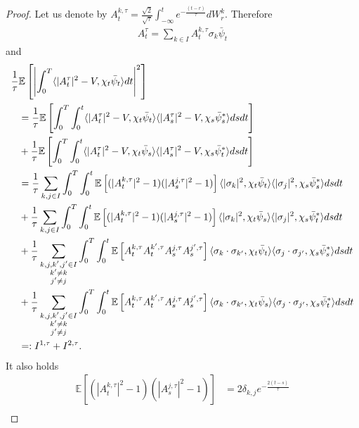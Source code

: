 \documentclass[10pt,a4paper]{amsart}
\begin{document}
\begin{proof}
Let us denote by $A^{k,\tau}_t=\frac{\sqrt{2}}{\sqrt{\tau}}\int_{-\infty}^t e^{-\frac{(t-r)}{\tau}}dW^{k}_r$. Therefore
\begin{align*}
    A^{\tau}_t=\sum_{k\in I } A^{k,\tau}_t\sigma_k\bar\psi_t
\end{align*}
and 
\begin{align}
\frac{1}{\tau}&\mathbb{E}\left[\left|\int_0^T \langle |A^\tau_t|^2-V, \chi_t\bar{\psi}_t\rangle dt\right|^2\right]\notag
\\ & = \frac{1}{\tau}\mathbb{E}\left[\int_0^T\int_0^t \langle |A^\tau_t|^2-V, \chi_t \bar{\psi}_t\rangle  
\langle |A^\tau_s|^2-V, \chi_s\bar{\psi}^*_s\rangle ds dt\right]\notag\\ &+\frac{1}{\tau}\mathbb{E}\left[\int_0^T\int_0^t \langle |A^\tau_t|^2-V, \chi_t \bar{\psi}_s\rangle  
\langle |A^\tau_s|^2-V, \chi_s\bar{\psi}^*_t\rangle ds dt\right]\notag\\
&= \frac{1}{\tau}\sum_{k,j\in I}\int_0^T\int_0^t 
\mathbb{E}\left[(|A^{k,\tau}_t|^2-1)(|A^{j,\tau}_s|^2-1)\right]
\langle |\sigma_k|^2, \chi_t\bar{\psi}_t\rangle 
\langle |\sigma_j|^2, \chi_s\bar{\psi}^*_s\rangle ds dt\notag\\&
+\frac{1}{\tau}\sum_{k,j\in I}\int_0^T\int_0^t 
\mathbb{E}\left[(|A^{k,\tau}_t|^2-1)(|A^{j,\tau}_s|^2-1)\right]
\langle |\sigma_k|^2, \chi_t\bar{\psi}_s\rangle 
\langle |\sigma_j|^2, \chi_s\bar{\psi}^*_t\rangle ds dt \notag\\
& +\frac{1}{\tau}\sum_{\substack{k,j,k',j'\in I\\ k'\neq k\\ j'\neq j}}
\int_0^T\int_0^t 
\mathbb{E}\left[A^{k,\tau}_tA^{k',\tau}_tA^{j,\tau}_s A^{j',\tau}_s \right] 
\langle \sigma_k \cdot\sigma_{k'}, \chi_t\bar{\psi}_t\rangle 
\langle \sigma_j\cdot\sigma_{j'}, \chi_s\bar{\psi}^*_s\rangle ds dt \notag\\
& + \frac{1}{\tau}\sum_{\substack{k,j,k',j'\in I\\ k'\neq k\\ j'\neq j}}
\int_0^T\int_0^t 
\mathbb{E}\left[A^{k,\tau}_tA^{k',\tau}_tA^{j,\tau}_s A^{j',\tau}_s \right] 
\langle \sigma_k \cdot\sigma_{k'}, \chi_t\bar{\psi}_s\rangle 
\langle \sigma_j\cdot\sigma_{j'}, \chi_s\bar{\psi}^*_t\rangle ds dt\notag\\ 
&=: I^{1,\tau}+I^{2,\tau}.
\label{eq:rewriting}
\end{align}
It also holds 
\begin{align}
  \mathbb{E}\left[(|A^{k,\tau}_t|^2-1)(|A^{j,\tau}_s|^2-1)\right]&=2\delta_{k,j} e^{-\frac{2(t-s)}{\tau}}\label{eq_1_expt} \\ 

\end{align}
\end{proof}
\end{document}
